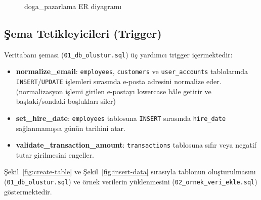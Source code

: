 \documentclass[12pt, a4paper]{report}
\begin{document}
\begin{figure}[H]
{%
  }
  \caption{doga\_pazarlama ER diyagramı}
  \label{fig:er}
\end{figure}

\subsection{Şema Tetikleyicileri (Trigger)}

Veritabanı şeması (\texttt{01\_db\_olustur.sql}) üç yardımcı trigger içermektedir:

\begin{itemize}
  \item \textbf{normalize\_email}: \texttt{employees}, \texttt{customers} ve \texttt{user\_accounts} tablolarında \texttt{INSERT}/\texttt{UPDATE} işlemleri sırasında e-posta adresini normalize eder. \\
    (normalizasyon işlemi girilen e-postayı lowercase hâle getirir ve  baştaki/sondaki boşlukları siler)
  \item \textbf{set\_hire\_date}: \texttt{employees} tablosuna \texttt{INSERT} sırasında \texttt{hire\_date} sağlanmamışsa günün tarihini atar.
  \item \textbf{validate\_transaction\_amount}: \texttt{transactions} tablosuna sıfır veya negatif tutar girilmesini engeller.
\end{itemize}

Şekil~\ref{fig:create-table} ve Şekil~\ref{fig:insert-data} sırasıyla tablonun oluşturulmasını (\texttt{01\_db\_olustur.sql}) ve örnek verilerin yüklenmesini (\texttt{02\_ornek\_veri\_ekle.sql}) göstermektedir.
\end{document}
